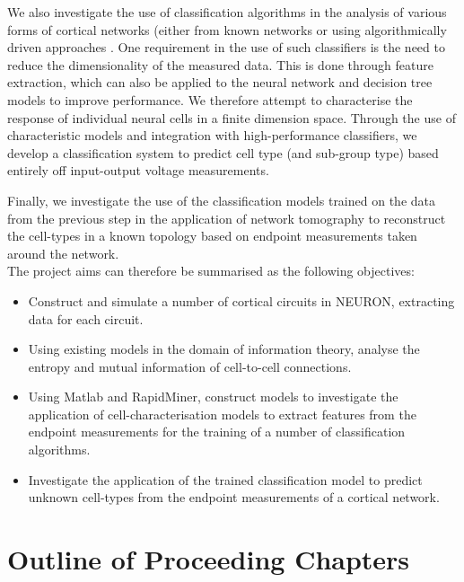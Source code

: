 We also investigate the use of classification algorithms in the analysis of various forms of cortical networks (either from known networks \cite{bbpTop} or using algorithmically driven approaches \cite{reimann2015algorithm}. One requirement in the use of such classifiers is the need to reduce the dimensionality of the measured data. This is done through feature extraction, which can also be applied to the neural network and decision tree models to improve performance. We therefore attempt to characterise the response of individual neural cells in a finite dimension space. Through the use of characteristic models and integration with high-performance classifiers, we develop a classification system to predict cell type (and sub-group type) based entirely off input-output voltage measurements.\\

\par

Finally, we investigate the use of the classification models trained on the data from the previous step in the application of network tomography to reconstruct the cell-types in a known topology based on endpoint measurements taken around the network.\\
The project aims can therefore be summarised as the following objectives:
\begin{itemize}
    \item Construct and simulate a number of cortical circuits in NEURON, extracting data for each circuit.
    \item Using existing models in the domain of information theory, analyse the entropy and mutual information of cell-to-cell connections.
    \item Using Matlab and RapidMiner, construct models to investigate the application of cell-characterisation models to extract features from the endpoint measurements for the training of a number of classification algorithms.
    \item Investigate the application of the trained classification model to predict unknown cell-types from the endpoint measurements of a cortical network.
\end{itemize}


\section{Outline of Proceeding Chapters}

